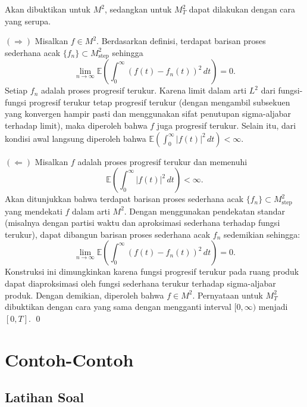 \documentclass[aspectratio=169,11pt]{beamer}
\theoremstyle{definition}
\begin{document}
\begin{frame}[allowframebreaks]{\insertsection}{\insertsubsection}
  Akan dibuktikan untuk $M^2$, sedangkan untuk $M_T^2$ dapat dilakukan dengan cara yang serupa.

  $(\Rightarrow)$ Misalkan $f \in M^2$. Berdasarkan definisi, terdapat barisan proses sederhana acak $\{f_n\} \subset M_{\text{step}}^2$ sehingga
  \begin{equation*}
    \lim_{n \to \infty} \mathbb{E}\left( \int_0^\infty (f(t) - f_n(t))^2 \, dt \right) = 0.
  \end{equation*}
  Setiap $f_n$ adalah proses progresif terukur. Karena limit dalam arti $L^2$ dari fungsi-fungsi progresif terukur tetap progresif terukur (dengan mengambil subsekuen yang konvergen hampir pasti dan menggunakan sifat penutupan sigma-aljabar terhadap limit), maka diperoleh bahwa $f$ juga progresif terukur. Selain itu, dari kondisi awal langsung diperoleh bahwa $\mathbb{E}\left( \int_0^\infty |f(t)|^2 \, dt \right) < \infty$.

  $(\Leftarrow)$ Misalkan $f$ adalah proses progresif terukur dan memenuhi
  \begin{equation*}
    \mathbb{E}\left( \int_0^\infty |f(t)|^2 \, dt \right) < \infty.
  \end{equation*}
  Akan ditunjukkan bahwa terdapat barisan proses sederhana acak $\{f_n\} \subset M_{\text{step}}^2$ yang mendekati $f$ dalam arti $M^2$. Dengan menggunakan pendekatan standar (misalnya dengan partisi waktu dan aproksimasi sederhana terhadap fungsi terukur), dapat dibangun barisan proses sederhana acak $f_n$ sedemikian sehingga:
  \begin{equation*}
    \lim_{n \to \infty} \mathbb{E}\left( \int_0^\infty (f(t) - f_n(t))^2 \, dt \right) = 0.
  \end{equation*}
  Konstruksi ini dimungkinkan karena fungsi progresif terukur pada ruang produk dapat diaproksimasi oleh fungsi sederhana terukur terhadap sigma-aljabar produk. Dengan demikian, diperoleh bahwa $f \in M^2$. Pernyataan untuk $M_T^2$ dibuktikan dengan cara yang sama dengan mengganti interval $[0, \infty)$ menjadi $[0, T]$. \qed
\end{frame}

\section{Contoh-Contoh}

\subsection{Latihan Soal}
\end{document}
